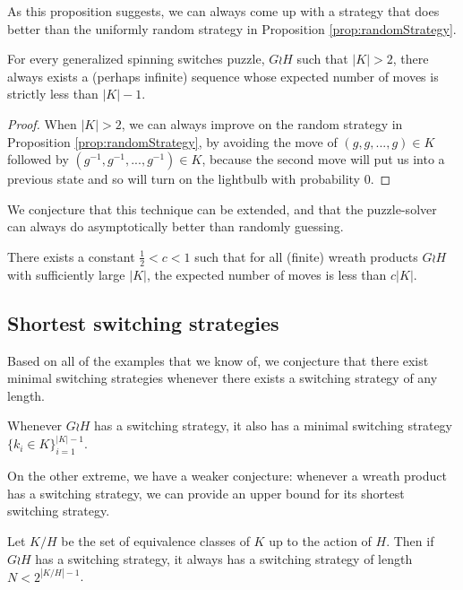 As this proposition suggests, we can always come up with a strategy that does
better than the uniformly random strategy in Proposition \ref{prop:randomStrategy}.

\begin{proposition}
  For every generalized spinning switches puzzle, $G \wr H$ such that
  $|K| > 2$, there always exists a (perhaps infinite) sequence
  whose expected number of moves is strictly less than $|K| - 1$.
\end{proposition}
\begin{proof}
  When $|K| > 2$, we can always improve on the random strategy in
  Proposition \ref{prop:randomStrategy}, by avoiding the move of
  $(g,g, ..., g) \in K$ followed by $(g^{-1},g^{-1}, ..., g^{-1}) \in K$,
  because the second move will put us into a previous state and so will
  turn on the lightbulb with probability $0$.
\end{proof}

We conjecture that this technique can be extended, and that the puzzle-solver
can always do asymptotically better than randomly guessing.

\begin{conjecture}
  There exists a constant $\frac{1}{2} < c < 1$ such that for all
  (finite) wreath products $G \wr H$ with sufficiently large $|K|$,
  the expected number of moves is less than $c|K|$.
\end{conjecture}

\subsection{Shortest switching strategies}
Based on all of the examples that we know of, we conjecture that there exist
minimal switching strategies whenever there exists a switching strategy of any
length.
\begin{conjecture}
  Whenever $G \wr H$ has a switching strategy, it also has a minimal switching
  strategy $\{k_i \in K\}_{i=1}^{|K| - 1}$.
\end{conjecture}

On the other extreme, we have a weaker conjecture: whenever a wreath product has
a switching strategy, we can provide an upper bound for its shortest switching
strategy.

\begin{conjecture}
  Let $K/H$ be the set of equivalence classes of $K$ up to the action of $H$.
  Then if $G \wr H$ has a switching strategy, it always has a switching strategy
  of length $N < 2^{|K/H|-1}$.
\end{conjecture}

